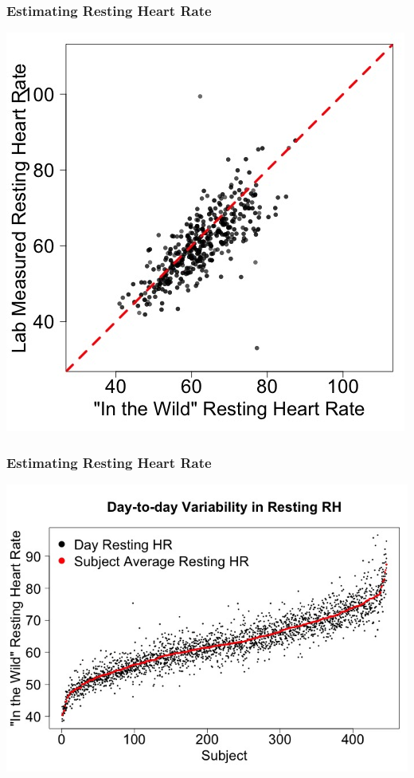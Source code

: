 \documentclass[10pt]{beamer}\usepackage[]{graphicx}\usepackage[]{color}
\begin{document}
\begin{frame}\frametitle{Estimating Resting Heart Rate}
\begin{center}
\includegraphics[height=\textheight]{resting_est_wild.jpeg}
\end{center}
\end{frame}

\begin{frame}\frametitle{Estimating Resting Heart Rate}
\begin{center}
\includegraphics[width=\textwidth]{resting_est_wild_day_to_day.jpeg}
\end{center}
\end{frame}
\end{document}
